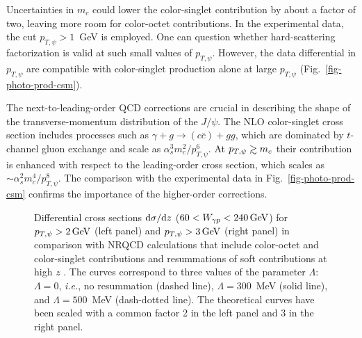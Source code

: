 Uncertainties in $m_c$ could lower the color-singlet contribution by
about a factor of two, leaving more room for color-octet
contributions.  In the experimental data, the cut $p_{T,\psi}>1$~GeV
is employed. One can question whether hard-scattering factorization is
valid at such small values of $p_{T,\psi}$. However, the data
differential in $p_{T,\psi}$ are compatible with color-singlet
production alone at large $p_{T,\psi}$
(Fig.~\ref{fig-photo-prod-csm}).

The next-to-leading-order QCD corrections are crucial in describing the
shape of the transverse-momentum distribution of the $J/\psi$. The NLO
color-singlet cross section includes processes such as $\gamma + g \to
(c\bar{c}) + g  g $, which are dominated by $t$-channel gluon exchange
and scale as $\alpha_s^3 m_c^2 / p_{T,\psi}^6$. At
$p_{T,\psi}\;\rlap{\lower 3.5 pt \hbox{$\mathchar \sim$}} \raise 1pt
\hbox {$>$}\;m_c$ their contribution is enhanced with respect to the
leading-order cross section, which scales as $\sim \alpha_s^2
m_c^4/p_{T,\psi}^8$. The comparison with the experimental data in
Fig.~\ref{fig-photo-prod-csm} confirms the importance of the
higher-order corrections.

\begin{figure}
\begin{center}
\caption{Differential cross sections ${\rm d}\sigma/{\rm d}z$
($60<W_{\gamma p}<240\,{\rm GeV}$) for $p_{T,\psi}>2\,{\rm GeV}$ (left
panel) and $p_{T,\psi}>3\,{\rm GeV}$ (right panel) in comparison with
NRQCD  calculations that include color-octet and color-singlet
contributions and resummations of soft contributions at high $z$
\cite{Beneke:1999gq}. The curves correspond to three values of the
parameter $\Lambda$: $\Lambda=0$, {\it i.e.}, no resummation (dashed
line), $\Lambda=300$~MeV (solid line), and $\Lambda= 500$~MeV
(dash-dotted line). The theoretical curves have  been scaled with a
common factor 2 in the left panel and 3 in the right panel.}
\label{gammap-beneke}
\end{center}
\end{figure}


